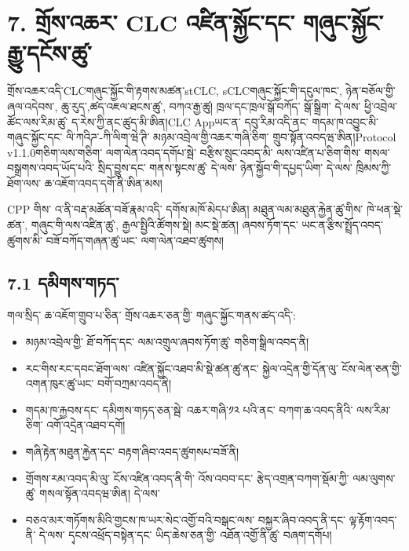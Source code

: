 \documentclass[11pt]{article}
\begin{document}
\section*{7. གྲོས་འཆར་ CLC འཛིན་སྐྱོང་དང་ གཞུང་སྐྱོང་ རྒྱུ་དངོས་ཚུ་}

གྲོས་འཆར་འདི་CLCགཞུང་སྐྱོང་གི་རྟགས་མཚན་stCLC, sCLCགཞུང་སྐྱོང་གི་དངུལ་ཁང་, ཉེན་བཅོལ་གྱི་ཞལ་འདེབས་, ཆུ་རུད་,ཚད་འཇལ་ཐངས་ཚུ་, བཀའ་རྒྱ་ཚུ། ཁྲལ་དང་ཁྲལ་སྒོ་བཀོད་ སྒོ་སྒྲིག་ དེ་ལས་ ཕྱི་འབྲེལ་ཚོང་ལས་རིམ་ཚུ་ ད་རེས་ཀྱི་ནང་ཚུད་མི་ཨིན།CLC Appཡང་ན་ དབུ་རིམ་འདི་ནང་ གདམ་ཁ་འབྱུང་མི་ གཞུང་སྐྱོང་དང་ ལི་ཀའིཌ་-ཀི་ལིག་ཝེ་ཊི་ མཉམ་འབྲེལ་གྱི་འཆར་གཞི་ཅིག་ གྲུབ་སྟོན་འབདཝ་ཨིན།Protocol v1.1.0གཅིག་ལས་གཅིག་ ལག་ལེན་འབད་དགོཔ་སྦེ་ བརྩིས་སྲུང་འབད་མི་ ལས་འཛིན་པ་ཅིག་གིས་ གསལ་བསྒྲགས་འབད་ཡོད་པའི་ སྲིད་བྱུས་དང་ གནས་སྟངས་ཚུ་ དེ་ལས་ ཉེན་སྐྱོབ་གི་དཔྱད་ཡིག་ དེ་ལས་ ཁྲིམས་ཀྱི་ཐོག་ལས་ ཆ་འཇོག་འབད་དགོ་ནི་ཨིན་མས།

CPP གིས་ འ་ནི་བརྡ་མཚོན་བཟོ་རྣམ་འདི་ དགོས་མཁོ་མེདཔ་ཨིན། མཐུན་ལམ་མཐུན་རྐྱེན་ཚུ་གིས་ ཁེ་ཕན་སྡེ་ཚན་, གཞུང་གི་ལས་འཛིན་ཚུ་, རྒྱལ་སྤྱིའི་ཚོགས་སྡེ། མང་སྡེ་ཚན། ཞབས་ཏོག་དང་ ཡང་ན་རྩིས་སྤྲོད་འབད་ཚུགས་མི་ བཟོ་བཀོད་གཞན་ཚུ་ཡང་ ལག་ལེན་འཐབ་ཚུགས།

\subsection*{7.1 དམིགས་གཏད་}

གལ་སྲིད་ ཆ་འཇོག་གྲུབ་པ་ཅིན་ གྲོས་འཆར་ཅན་གྱི་ གཞུང་སྐྱོང་གནས་ཚད་འདི་:

\begin{itemize}[leftmargin=*]
\item མཉམ་འབྲེལ་གྱི་ ཐོ་བཀོད་དང་ ལམ་འགྲུལ་ཞབས་ཏོག་ཚུ་ གཅིག་སྒྲིལ་འབད་ནི།
\item རང་གིས་རང་དབང་ཐོག་ལས་ འཛིན་སྐྱོང་འཐབ་མི་སྡེ་ཚན་ཚུ་ནང་ སྐྱེལ་འདྲེན་གྱི་དོན་ལུ་ ངོས་ལེན་ཅན་གྱི་ འགན་ཁུར་ཚུ་ཡང་ བགོ་བཀྲམ་འབད་ནི།
\item གདམ་ཁ་རྐྱབས་དང་ དམིགས་གཏད་ཅན་སྦེ་ འཆར་གཞི་༡༢ པའི་ནང་ བཀག་ཆ་འབད་ནིའི་ ལས་རིམ་ཅིག་ འགོ་འདྲེན་འཐབ་དགོ།
\item གཞི་རྟེན་མཐུན་རྐྱེན་དང་ བརྟག་ཞིབ་འབད་ཚུགསཔ་བཟོ་ནི།
\item གྲོགས་རམ་འབད་མི་ལུ་ ངོས་འཛིན་འབད་ནི་གི་ འོས་འབབ་དང་ རྩེད་འགྲན་བཀག་སྡོམ་ཀྱི་ ལམ་ལུགས་ཚུ་ གསལ་སྟོན་འབདཝ་ཨིན། དེ་ལས་
\item བཅའ་མར་གཏོགས་མིའི་གྱངས་ཁ་ཡར་སེང་འགྱོ་བའི་བསྒང་ལས་ བསྐྱར་ཞིབ་འབད་ནི་དང་ ལྟ་རྟོག་འབད་ནི་ དེ་ལས་ དྭངས་འཕྲོད་བསྟེན་དང་ ཡིད་ཆེས་ཅན་གྱི་ འཐོན་འགྱོ་ནི་ཚུ་ བཞག་དགོཔ།
\end{itemize}
\end{document}
